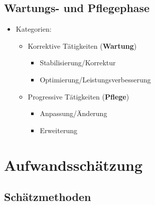 \documentclass[parskip=full, 12pt]{scrartcl}
\begin{document}
		\subsection{Wartungs- und Pflegephase}

			\begin{itemize}
				\item Kategorien:
				\begin{itemize}
					\item Korrektive Tätigkeiten (\textbf{Wartung})
					\begin{itemize}
						\item Stabilisierung/Korrektur
						\item Optimierung/Leistungsverbesserung
					\end{itemize}
					\item Progressive Tätigkeiten (\textbf{Pflege})
					\begin{itemize}
						\item Anpassung/Änderung
						\item Erweiterung
					\end{itemize}
				\end{itemize}
			\end{itemize}
	
	\newpage
	\section{Aufwandsschätzung}
	
		\subsection{Schätzmethoden}
		
\end{document}
